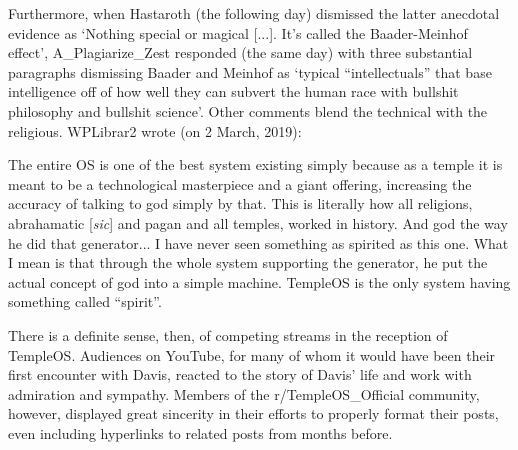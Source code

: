 \documentclass[Draft.tex]{subfiles}
\begin{document}
Furthermore, when Hastaroth (the following day) dismissed
the latter anecdotal evidence as `Nothing special or magical [...].
It's called the Baader-Meinhof effect', A\_Plagiarize\_Zest responded
(the same day) with three substantial paragraphs dismissing Baader and Meinhof
as `typical ``intellectuals'' that base intelligence off of
how well they can subvert the human race
with bullshit philosophy and bullshit science'.
Other comments blend the technical with the religious.
WPLibrar2 wrote (on 2 March, 2019):
\begin{displayquote}
	The entire OS is one of the best system existing simply because
	as a temple it is meant to be a technological masterpiece
	and a giant offering, increasing the accuracy
	of talking to god simply by that.
	This is literally how all religions, abrahamatic [\textit{sic}] and pagan
	and all temples, worked in history.
	And god the way he did that generator...
	I have never seen something as spirited as this one.
	What I mean is that through the whole system supporting the generator,
	he put the actual concept of god into a simple machine.
	TempleOS is the only system having something called ``spirit''.
\end{displayquote}

There is a definite sense, then, of competing streams in the reception
of TempleOS.
Audiences on YouTube, for many of whom it would have been their first
encounter with Davis, reacted to the story of Davis' life and work
with admiration and sympathy.
Members of the r/TempleOS\_Official community, however, displayed
great sincerity in their efforts to properly format their posts,
even including hyperlinks to related posts from months before.
\end{document}

